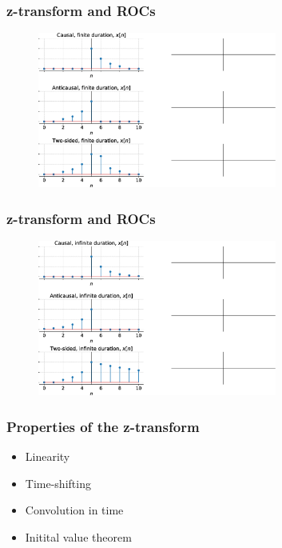\documentclass[aspectratio=169]{beamer}
\let\olditem\item
\renewcommand{\item}{\setlength{\itemsep}{\fill}\olditem}
\begin{document}
\begin{frame}[t]
  \frametitle{z-transform and ROCs}
  \begin{center}
  \begin{figure}
  \centering
  \includegraphics[width=0.7\textwidth, left]{img/ztrans-finite-dur.eps}
  \end{figure}
  \end{center}
\end{frame}


\begin{frame}[t]
  \frametitle{z-transform and ROCs}
  \begin{center}
  \begin{figure}
  \centering
  \includegraphics[width=0.7\textwidth, left]{img/ztrans-infinite-dur.eps}
  \end{figure}
  \end{center}
\end{frame}


\begin{frame}[t]
  \frametitle{Properties of the z-transform}
  \begin{itemize}
      \item Linearity
      \item Time-shifting
      \item Convolution in time
      \item Initital value theorem
    \end{itemize}  
\end{frame}
\end{document}

